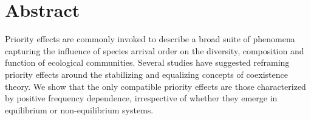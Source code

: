 \section{Abstract}
Priority effects are commonly invoked to describe a broad suite of phenomena capturing the influence of species arrival order on the diversity, composition and function of ecological communities. Several studies have suggested reframing priority effects around the stabilizing and equalizing concepts of coexistence theory. We show that the only compatible priority effects are those characterized by positive frequency dependence, irrespective of whether they emerge in equilibrium or non-equilibrium systems. 



